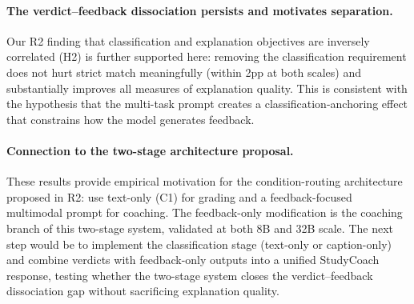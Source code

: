 \documentclass{article}
\begin{document}
\paragraph{The verdict--feedback dissociation persists and motivates separation.}
Our R2 finding that classification and explanation objectives are inversely correlated (H2) is further
supported here: removing the classification requirement does not hurt strict match meaningfully (within
2pp at both scales) and substantially improves all measures of explanation quality. This is consistent
with the hypothesis that the multi-task prompt creates a classification-anchoring effect that
constrains how the model generates feedback.

\paragraph{Connection to the two-stage architecture proposal.}
These results provide empirical motivation for the condition-routing architecture proposed in R2: use
text-only (C1) for grading and a feedback-focused multimodal prompt for coaching. The feedback-only
modification is the coaching branch of this two-stage system, validated at both 8B and 32B scale.
The next step would be to implement the classification stage (text-only or caption-only) and combine
verdicts with feedback-only outputs into a unified StudyCoach response, testing whether the two-stage
system closes the verdict--feedback dissociation gap without sacrificing explanation quality.
\end{document}
